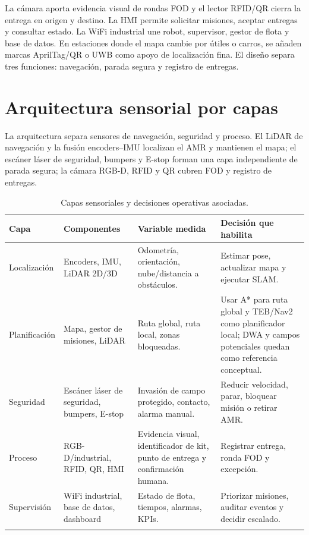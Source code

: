 La cámara aporta evidencia visual de rondas FOD y el lector RFID/QR cierra la entrega en origen y destino. La HMI permite solicitar misiones, aceptar entregas y consultar estado. La WiFi industrial une robot, supervisor, gestor de flota y base de datos. En estaciones donde el mapa cambie por útiles o carros, se añaden marcas AprilTag/QR o UWB como apoyo de localización fina. El diseño separa tres funciones: navegación, parada segura y registro de entregas.

\section{Arquitectura sensorial por capas}

La arquitectura separa sensores de navegación, seguridad y proceso. El LiDAR de navegación y la fusión encoders--IMU localizan el AMR y mantienen el mapa; el escáner láser de seguridad, bumpers y E-stop forman una capa independiente de parada segura; la cámara RGB-D, RFID y QR cubren FOD y registro de entregas.

\begin{longtable}{P{0.20\textwidth}P{0.24\textwidth}P{0.22\textwidth}P{0.24\textwidth}}
\toprule
Capa & Componentes & Variable medida & Decisión que habilita\\
\midrule
\endhead
Localización & Encoders, IMU, LiDAR 2D/3D & Odometría, orientación, nube/distancia a obstáculos. & Estimar pose, actualizar mapa y ejecutar SLAM.\\
Planificación & Mapa, gestor de misiones, LiDAR & Ruta global, ruta local, zonas bloqueadas. & Usar A* para ruta global y TEB/Nav2 como planificador local; DWA y campos potenciales quedan como referencia conceptual.\\
Seguridad & Escáner láser de seguridad, bumpers, E-stop & Invasión de campo protegido, contacto, alarma manual. & Reducir velocidad, parar, bloquear misión o retirar AMR.\\
Proceso & RGB-D/industrial, RFID, QR, HMI & Evidencia visual, identificador de kit, punto de entrega y confirmación humana. & Registrar entrega, ronda FOD y excepción.\\
Supervisión & WiFi industrial, base de datos, dashboard & Estado de flota, tiempos, alarmas, KPIs. & Priorizar misiones, auditar eventos y decidir escalado.\\
\bottomrule
\caption{Capas sensoriales y decisiones operativas asociadas.}
\label{tab:capas-sensores}
\end{longtable}

